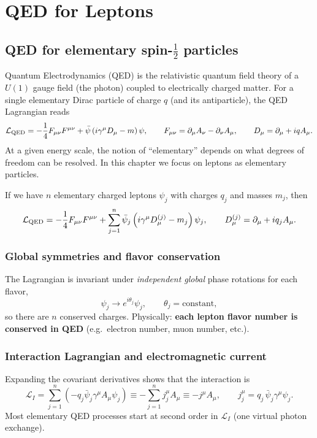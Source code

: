 
\chapter{QED for Leptons}
\label{ch:qed_leptons}

\section{QED for elementary spin-$\tfrac12$ particles}
Quantum Electrodynamics (QED) is the relativistic quantum field theory of a $U(1)$ gauge field
(the photon) coupled to electrically charged matter. For a single elementary Dirac particle
of charge $q$ (and its antiparticle), the QED Lagrangian reads
\begin{equation}
\mathcal{L}_{\rm QED}
= -\frac14 F_{\mu\nu}F^{\mu\nu} + \bar\psi\left(i\gamma^\mu D_\mu - m\right)\psi,
\qquad
F_{\mu\nu}=\partial_\mu A_\nu-\partial_\nu A_\mu,
\qquad
D_\mu=\partial_\mu+i q A_\mu.
\end{equation}
At a given energy scale, the notion of ``elementary'' depends on what degrees of freedom can be
resolved. In this chapter we focus on leptons as elementary particles.

If we have $n$ elementary charged leptons $\psi_j$ with charges $q_j$ and masses $m_j$, then
\begin{equation}
\mathcal{L}_{\rm QED}
= -\frac14 F_{\mu\nu}F^{\mu\nu}
+ \sum_{j=1}^{n}\bar\psi_j\left(i\gamma^\mu D^{(j)}_\mu - m_j\right)\psi_j,
\qquad
D^{(j)}_\mu=\partial_\mu+i q_j A_\mu.
\end{equation}

\subsection{Global symmetries and flavor conservation}
The Lagrangian is invariant under \emph{independent global} phase rotations for each flavor,
\begin{equation}
\psi_j \to e^{i\theta_j}\psi_j,
\qquad \theta_j=\text{constant},
\end{equation}
so there are $n$ conserved charges. Physically: \textbf{each lepton flavor number is conserved in QED}
(e.g.\ electron number, muon number, etc.).

\subsection{Interaction Lagrangian and electromagnetic current}
Expanding the covariant derivatives shows that the interaction is
\begin{equation}
\mathcal{L}_I = \sum_{j=1}^n \left(-q_j \bar\psi_j\gamma^\mu A_\mu \psi_j\right)
\equiv -\sum_{j=1}^n j^\mu_j A_\mu \equiv - j^\mu A_\mu,
\qquad
j^\mu_j = q_j\,\bar\psi_j\gamma^\mu\psi_j.
\end{equation}
Most elementary QED processes start at second order in $\mathcal{L}_I$ (one virtual photon exchange).

